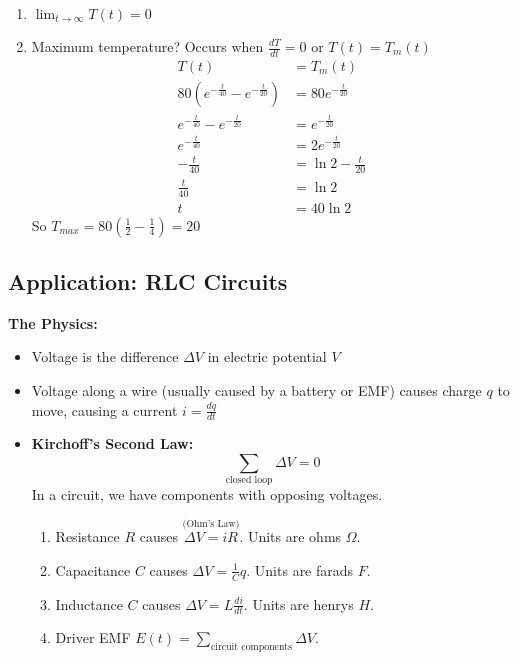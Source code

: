 \documentclass[../main.tex]{subfiles}
\begin{document}
\begin{example}[]
    \begin{enumerate}[mode=unboxed,label=\alph*),start=2]
        \item \( \boxed{ \lim_{t\to\infty}T(t)= 0 } \)
        \item Maximum temperature? Occurs when \( \frac{dT}{dt} =0\) or \( T(t)=T_{m}(t) \)
            \begin{align*}
                T(t) &= T_m(t) \\
                80(e^{-\frac{t}{40}}-e^{-\frac{t}{20}}) &= 80e^{-\frac{t}{20}} \\
                e^{-\frac{t}{40}}-e^{-\frac{t}{20}} &= e^{-\frac{t}{20}} \\
                e^{-\frac{t}{40}} &= 2e^{-\frac{t}{20}} \\
                -\frac{t}{40} &= \ln 2 - \frac{t}{20} \\
                \frac{t}{40} &= \ln 2 \\
                t &= 40\ln 2
            \end{align*}
            So \( T_{max} = 80\left( \frac{1}{2}-\frac{1}{4} \right) = \boxed{20} \)
    \end{enumerate}
\end{example}


\subsection{Application: RLC Circuits}

\textbf{The Physics:}
\begin{itemize}[mode=unboxed]
    \item Voltage is the difference \( \Delta V \) in electric potential \( V \)
    \item Voltage along a wire (usually caused by a battery or EMF) causes charge \( q \) to move,
        causing a current \( \displaystyle i = \frac{dq}{dt} \)
    \item \textbf{Kirchoff's Second Law:}
        \[ \sum_{\text{closed loop}} \Delta V = 0 \]
        In a circuit, we have components with opposing voltages.
        \begin{enumerate}
            \item Resistance \( R \) causes \( \overset{\text{(Ohm's Law)}}{\Delta V = iR} \). Units are ohms \( \Omega \).
            \item Capacitance \( C \) causes \( \displaystyle \Delta V = \frac{1}{C}q \). Units are farads \( F \).
            \item Inductance \( C \) causes \( \displaystyle \Delta V = L\frac{di}{dt} \). Units are henrys \( H \).
            \item Driver EMF \( E(t)=\sum_{\text{circuit components}} \Delta V \).
        \end{enumerate}
\end{itemize}
\end{document}
